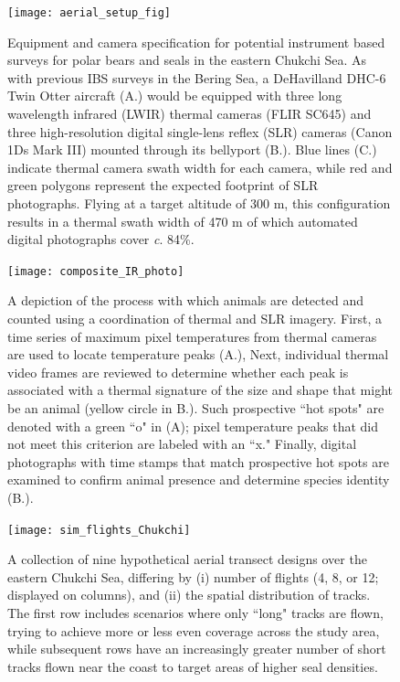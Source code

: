 \documentclass[]{rsos}%
\begin{document}
\begin{figure}[ht]
\centering
\caption{Equipment and camera specification for potential instrument based surveys for polar bears and seals in the eastern Chukchi Sea.  As with previous IBS surveys in the Bering Sea, a DeHavilland DHC-6 Twin Otter aircraft (A.) would be equipped with three long wavelength infrared (LWIR) thermal cameras (FLIR SC645) and three high-resolution digital single-lens reflex (SLR) cameras (Canon 1Ds Mark III) mounted through its bellyport (B.).  Blue lines (C.) indicate thermal camera swath width for each camera, while red and green polygons represent the expected footprint of SLR photographs. Flying at a target altitude of 300 m, this configuration results in a thermal swath width of 470 m of which automated digital photographs cover \textit{c}. 84\%. }
\texttt{[image: aerial\_setup\_fig]}
\label{fig:platform}
\end{figure}

\begin{figure}[ht]
\centering
\caption{A depiction of the process with which animals are detected and counted using a coordination of thermal and SLR imagery.  First, a time series of maximum pixel temperatures from thermal cameras are used to locate temperature peaks (A.), Next, individual thermal video frames are reviewed to determine whether each peak is associated with a thermal signature of the size and shape that might be an animal (yellow circle in B.). Such prospective ``hot spots" are denoted with a green ``o" in (A); pixel temperature peaks that did not meet this criterion are labeled with an ``x." Finally, digital photographs with time stamps that match prospective hot spots are examined to confirm animal presence and determine species identity (B.).}
\texttt{[image: composite\_IR\_photo]}
\label{fig:composite}
\end{figure}

\begin{figure}[ht]
\centering
\caption{A collection of nine hypothetical aerial transect designs over the eastern Chukchi Sea, differing by (i) number of flights (4, 8, or 12; displayed on columns), and (ii) the spatial distribution of tracks.  The first row includes scenarios where only ``long" tracks are flown, trying to achieve more or less even coverage across the study area, while subsequent rows have an increasingly greater number of short tracks flown near the coast to target areas of higher seal densities.}
\texttt{[image: sim\_flights\_Chukchi]}
\label{fig:flights}
\end{figure}
\end{document}

